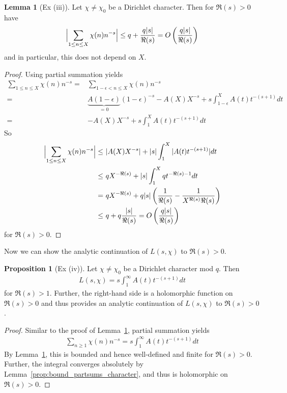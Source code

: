 \documentclass{scrartcl}
\theoremstyle{definition}
\newtheorem{lemma}[definition]{Lemma}
\newtheorem{proposition}[definition]{Proposition}
\begin{document}
\begin{lemma}[Ex (iii)]
    \label{prop:character_partsums_bounded}
    Let $\chi \neq \chi_0$ be a Dirichlet character.
    Then for $\Re(s) > 0$ have
    \begin{equation*}
        \Bigl| \sum_{1 \leq n \leq X} \chi(n) n^{-s} \Bigr| \leq q + \frac {q|s|} {\Re(s)} = O\left( \frac {q|s|} {\Re(s)} \right)
    \end{equation*}
    and in particular, this does not depend on $X$.
\end{lemma}
\begin{proof}
    Using partial summation yields
    \begin{align*}
        \sum_{1 \leq n \leq X} \chi(n) n^{-s} =& \sum_{1 - \epsilon < n \leq X} \chi(n) n^{-s} \\
        =& \underbrace{A(1 - \epsilon)}_{= 0} (1 - \epsilon)^{-s} - A(X) X^{-s} + s\int_{1 - \epsilon}^X A(t) t^{-(s + 1)} dt \\
        =& -A(X) X^{-s} + s\int_1^X A(t) t^{-(s + 1)} dt
    \end{align*}
    So
    \begin{align*}
        \Bigl| \sum_{1 \leq n \leq X} \chi(n) n^{-s} \Bigr| \leq& \ |A(X) X^{-s}| + |s| \int_1^X |A(t) t^{-(s + 1)}| dt \\
        \leq& \ q X^{-\Re(s)} + |s| \int_1^X q t^{-\Re(s) - 1} dt \\
        =& \ q X^{-\Re(s)} + q|s| \left( \frac 1 {\Re(s)} - \frac 1 {X^{\Re(s)}\Re(s)} \right) \\
        \leq& \ q + q \frac {|s|} {\Re(s)} = O\left( \frac {q|s|} {\Re(s)} \right)
    \end{align*}
    for $\Re(s) > 0$.
\end{proof}
Now we can show the analytic continuation of $L(s, \chi)$ to $\Re(s) > 0$.
\begin{proposition}[Ex (iv)]
    Let $\chi \neq \chi_0$ be a Dirichlet character mod $q$.
    Then
    \begin{align*}
        L(s, \chi) = s \int_1^\infty A(t) t^{-(s + 1)} dt
    \end{align*}
    for $\Re(s) > 1$.
    Further, the right-hand side is a holomorphic function on $\Re(s) > 0$ and thus provides an analytic continuation of $L(s, \chi)$ to $\Re(s) > 0$.
\end{proposition}
\begin{proof}
    Similar to the proof of Lemma~\ref{prop:character_partsums_bounded}, partial summation yields
    \begin{align*}
        \sum_{n \geq 1} \chi(n) n^{-s} = s \int_1^\infty A(t) t^{-(s + 1)} dt
    \end{align*}
    By Lemma~\ref{prop:character_partsums_bounded}, this is bounded and hence well-defined and finite for $\Re(s) > 0$.
    Further, the integral converges absolutely by Lemma~\ref{prop:bound_partsums_character}, and thus is holomorphic on $\Re(s) > 0$.
\end{proof}
\end{document}
